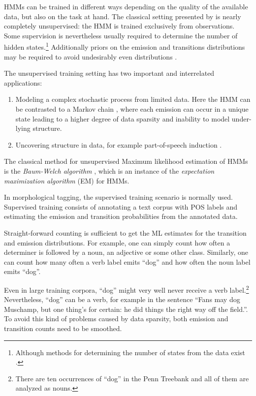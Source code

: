 HMMs can be trained in different ways depending on the quality of the
available data, but also on the task at hand. The classical setting
presented by \cite{Rabiner1989} is nearly completely unsupervised: the
HMM is trained exclusively from observations. Some supervision is
nevertheless usually required to determine the number of hidden
states.\footnote{Although methods for determining the number of states
  from the data exist \citep{foo}.} Additionally priors on the
emission and transitions distributions may be required to avoid
undesirably even distributions
\citep{Cutting1992,Johnson2007}.

The unsupervised training setting has two important and
interrelated applications:
\begin{enumerate}
\item Modeling a complex stochastic process from limited data. Here
  the HMM can be contrasted to a Markov chain \citep[318--320]{Manning1999}, where
  each emission can occur in a unique state leading to a higher degree
  of data sparsity and inability to model under-lying structure.
\item Uncovering structure in data, for example part-of-speech
  induction \citep{Johnson2007}.
\end{enumerate}
The classical method for unsupervised Maximum likelihood estimation of
HMMs is the {\it Baum-Welch algorithm} \citep{Rabiner1989}, which is
an instance of the {\it expectation maximization algorithm} (EM)
\citep{Dempster1977} for HMMs.

In morphological tagging, the supervised training scenario is normally
used. Supervised training consists of annotating a text corpus with
POS labels and estimating the emission and transition probabilities
from the annotated data.

Straight-forward counting is sufficient to get the ML estimates for
the transition and emission distributions. For example, one can simply
count how often a determiner is followed by a noun, an adjective or
some other class. Similarly, one can count how many often a verb label
emits ``dog'' and how often the noun label emits ``dog''. 

Even in large training corpora, ``dog'' might very well never receive
a verb label.\footnote{There are ten occurrences of ``dog'' in the Penn
  Treebank and all of them are analyzed as nouns.} Nevertheless,
``dog'' can be a verb, for example in the sentence ``Fans may dog
Muschamp, but one thing's for certain: he did things the right way off
the field.''. To avoid this kind of problems caused by data sparsity,
both emission and transition counts need to be smoothed.

